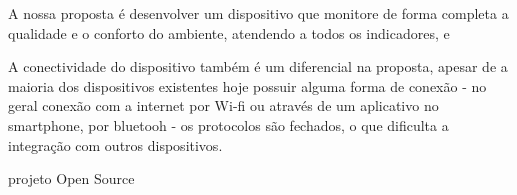 \documentclass[]{politex}
\begin{document}
 A nossa proposta é desenvolver um dispositivo que monitore de forma completa a qualidade e o conforto do ambiente, atendendo a todos os indicadores, e 
 

A conectividade do dispositivo também é um diferencial na proposta, apesar de a maioria dos dispositivos existentes hoje possuir alguma forma de conexão - no geral conexão com a internet por Wi-fi ou através de um aplicativo no smartphone, por bluetooh - os protocolos são fechados, o que dificulta a integração com outros dispositivos. 

projeto Open Source

%

%



\end{document}
